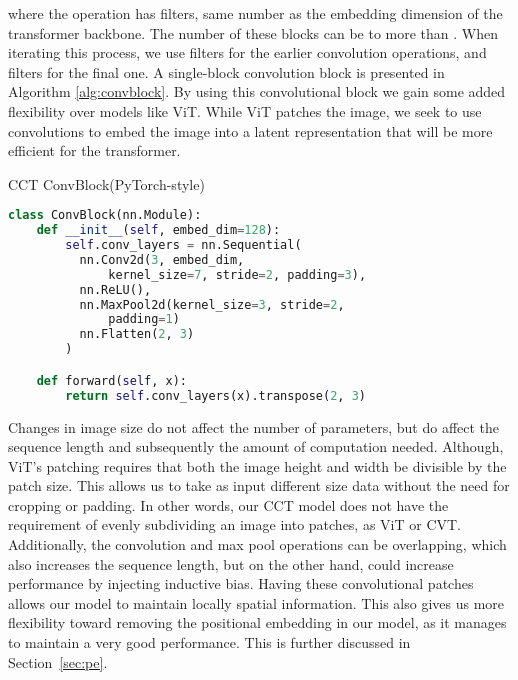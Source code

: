 \documentclass[10pt,twocolumn,letterpaper]{article}
\begin{document}
where the  operation has  filters, same number as the embedding dimension of the transformer backbone.
The number of these blocks can be to more than . When iterating this process, we use  filters for the earlier convolution operations, and  filters for the final one. A single-block convolution block is presented in Algorithm \ref{alg:convblock}.
By using this convolutional block we gain some added flexibility over models like ViT. 
While ViT patches the image, we seek to use convolutions to embed the image into a latent representation that will be more efficient for the transformer. 

\begin{algorithm}[ht]
   \caption{CCT ConvBlock(PyTorch-style)}
   \label{alg:convblock}
\begin{lstlisting}[language=python]
class ConvBlock(nn.Module):
    def __init__(self, embed_dim=128):
        self.conv_layers = nn.Sequential(
          nn.Conv2d(3, embed_dim,
              kernel_size=7, stride=2, padding=3),
          nn.ReLU(),
          nn.MaxPool2d(kernel_size=3, stride=2,
              padding=1)
          nn.Flatten(2, 3)
        )

    def forward(self, x):
        return self.conv_layers(x).transpose(2, 3)
\end{lstlisting}
\end{algorithm}

Changes in image size do not affect the number of parameters, but do affect the sequence length and subsequently the amount of computation needed. Although, ViT's patching requires that both the image height and width be divisible by the patch size.
This allows us to take as input different size data without the need for cropping or padding. 
In other words, our CCT model does not have the requirement of evenly subdividing an image into patches, as ViT or CVT.
Additionally, the convolution and max pool operations can be overlapping, which also increases the sequence length, but on the other hand, could increase performance by injecting inductive bias.
Having these convolutional patches allows our model to maintain locally spatial information. 
This also  gives us more flexibility toward removing the positional embedding in our model, as it manages to maintain a very good performance. 
This is further discussed in Section~\ref{sec:pe}. 
\end{document}

